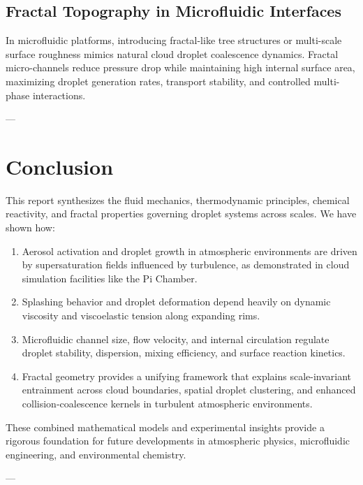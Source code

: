 \documentclass{article}
\begin{document}
\subsection{Fractal Topography in Microfluidic Interfaces}
In microfluidic platforms, introducing fractal-like tree structures or multi-scale surface roughness mimics natural cloud droplet coalescence dynamics. Fractal micro-channels reduce pressure drop while maintaining high internal surface area, maximizing droplet generation rates, transport stability, and controlled multi-phase interactions.

---

\section{Conclusion}
This report synthesizes the fluid mechanics, thermodynamic principles, chemical reactivity, and fractal properties governing droplet systems across scales. We have shown how:
\begin{enumerate}
    \item Aerosol activation and droplet growth in atmospheric environments are driven by supersaturation fields influenced by turbulence, as demonstrated in cloud simulation facilities like the Pi Chamber.
    \item Splashing behavior and droplet deformation depend heavily on dynamic viscosity and viscoelastic tension along expanding rims.
    \item Microfluidic channel size, flow velocity, and internal circulation regulate droplet stability, dispersion, mixing efficiency, and surface reaction kinetics.
    \item Fractal geometry provides a unifying framework that explains scale-invariant entrainment across cloud boundaries, spatial droplet clustering, and enhanced collision-coalescence kernels in turbulent atmospheric environments.
\end{enumerate}

These combined mathematical models and experimental insights provide a rigorous foundation for future developments in atmospheric physics, microfluidic engineering, and environmental chemistry.

---
\end{document}
